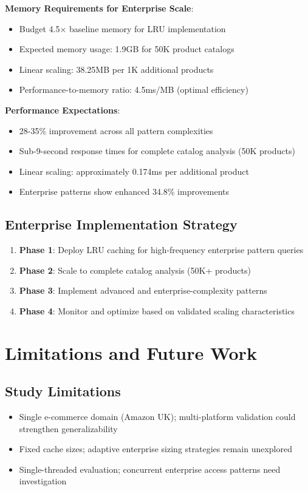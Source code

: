 \documentclass[conference]{IEEEtran}
\begin{document}
\textbf{Memory Requirements for Enterprise Scale}:
\begin{itemize}
\item Budget 4.5× baseline memory for LRU implementation
\item Expected memory usage: 1.9GB for 50K product catalogs
\item Linear scaling: 38.25MB per 1K additional products
\item Performance-to-memory ratio: 4.5ms/MB (optimal efficiency)
\end{itemize}

\textbf{Performance Expectations}:
\begin{itemize}
\item 28-35\% improvement across all pattern complexities
\item Sub-9-second response times for complete catalog analysis (50K products)
\item Linear scaling: approximately 0.174ms per additional product
\item Enterprise patterns show enhanced 34.8\% improvements
\end{itemize}

\subsection{Enterprise Implementation Strategy}

\begin{enumerate}
\item \textbf{Phase 1}: Deploy LRU caching for high-frequency enterprise pattern queries
\item \textbf{Phase 2}: Scale to complete catalog analysis (50K+ products)
\item \textbf{Phase 3}: Implement advanced and enterprise-complexity patterns
\item \textbf{Phase 4}: Monitor and optimize based on validated scaling characteristics
\end{enumerate}

\section{Limitations and Future Work}

\subsection{Study Limitations}

\begin{itemize}
\item Single e-commerce domain (Amazon UK); multi-platform validation could strengthen generalizability
\item Fixed cache sizes; adaptive enterprise sizing strategies remain unexplored
\item Single-threaded evaluation; concurrent enterprise access patterns need investigation
\end{itemize}
\end{document}
